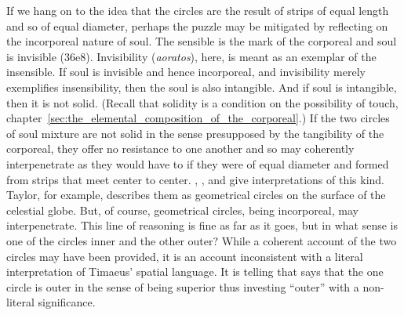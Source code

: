 If we hang on to the idea that the circles are the result of strips of equal length and so of equal diameter, perhaps the puzzle may be mitigated by reflecting on the incorporeal nature of soul. The sensible is the mark of the corporeal and soul is invisible (36e8). Invisibility (\emph{aoratos}), here, is meant as an exemplar of the insensible. If soul is invisible and hence incorporeal, and invisibility merely exemplifies insensibility, then the soul is also intangible. And if soul is intangible, then it is not solid. (Recall that solidity is a condition on the possibility of touch, chapter~\ref{sec:the_elemental_composition_of_the_corporeal}.) If the two circles of soul mixture are not solid in the sense presupposed by the tangibility of the corporeal, they offer no resistance to one another and so may coherently interpenetrate as they would have to if they were of equal diameter and formed from strips that meet center to center. \citet[111--2 n7]{Archer-Hind:1888qd}, \citet[148]{Taylor:1928qb}, and \citet[120--1]{Dicks:1970aa} give interpretations of this kind. Taylor, for example, describes them as geometrical circles on the surface of the celestial globe. But, of course, geometrical circles, being incorporeal, may interpenetrate. This line of reasoning is fine as far as it goes, but in what sense is one of the circles inner and the other outer? While a coherent account of the two circles may have been provided, it is an account inconsistent with a literal interpretation of Timaeus' spatial language. It is telling that \citet[112 n3]{Archer-Hind:1888qd} says that the one circle is outer in the sense of being superior thus investing ``outer'' with a non-literal significance.

